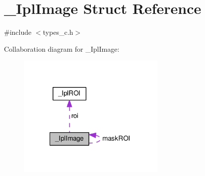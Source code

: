 \hypertarget{struct__IplImage}{\section{\-\_\-\-Ipl\-Image Struct Reference}
\label{struct__IplImage}
}


{\ttfamily \#include $<$types\-\_\-c.\-h$>$}



Collaboration diagram for \-\_\-\-Ipl\-Image\-:\nopagebreak
\begin{figure}[H]
\begin{center}
\leavevmode
\includegraphics[width=202pt]{struct__IplImage__coll__graph}
\end{center}
\end{figure}
